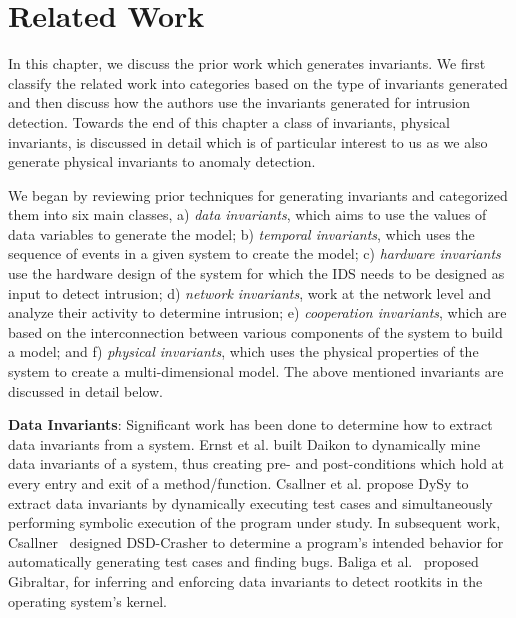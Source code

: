 
\chapter{Related Work}
\label{ch:RelatedWork}

In this chapter, we discuss the prior work which generates invariants. We first classify the related work into categories based on the type of invariants generated and then discuss how the authors use the invariants generated for intrusion detection. Towards the end of this chapter a class of invariants, physical invariants, is discussed in detail which is of particular interest to us as we also generate physical invariants to anomaly detection.

We began by reviewing prior techniques for generating invariants and categorized them into six main classes, a) \textit{data invariants}, which aims to use the values of data variables to generate the model; b) \textit{temporal invariants}, which uses the sequence of events in a given system to create the model; c) \textit{hardware invariants} use the hardware design of the system for which the \ac{IDS} needs to be designed as input to detect intrusion; d) \textit{network invariants}, work at the network level and analyze their activity to determine intrusion; e) \textit{cooperation invariants}, which are based on the interconnection between various components of the system to build a model; and f) \textit{physical invariants}, which uses the physical properties of the system to create a multi-dimensional model. The above mentioned invariants are discussed in detail below.

\textbf{Data Invariants}: Significant work \cite{ernst2007daikon, csallner2008dysy, baliga2008automatic, baliga2011detecting, csallner2008dsd} has been done to determine how to extract data invariants from a system. Ernst et al. \cite{ernst2007daikon} built Daikon to dynamically mine data invariants of a system, thus creating pre- and post-conditions which hold at every entry and exit of a method/function.  Csallner et al. \cite{csallner2008dysy} propose DySy to extract data invariants by dynamically executing test cases and simultaneously performing symbolic execution of the program under study. In subsequent work, Csallner~\cite{csallner2008dsd} designed DSD-Crasher to determine a program's intended behavior for automatically generating test cases and finding bugs.
Baliga et al.~\cite{baliga2008automatic, baliga2011detecting} proposed Gibraltar, for inferring and enforcing data invariants to detect rootkits in the operating system's kernel.  

